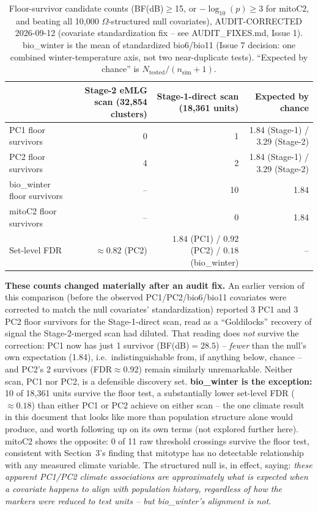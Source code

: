 \documentclass[11pt]{article}
\begin{document}
\begin{table}[H]\centering\small
\begin{tabular}{lrrr}
\toprule
 & Stage-2 eMLG scan (32{,}854 clusters) & Stage-1-direct scan (18{,}361 units) & Expected by chance \\
\midrule
PC1 floor survivors & 0 & 1 & 1.84 (Stage-1) / 3.29 (Stage-2) \\
PC2 floor survivors & 4 & 2 & 1.84 (Stage-1) / 3.29 (Stage-2) \\
bio\_winter floor survivors & -- & 10 & 1.84 \\
mitoC2 floor survivors & -- & 0 & 1.84 \\
Set-level FDR & $\approx0.82$ (PC2) & $1.84$ (PC1) / $0.92$ (PC2) / $\mathbf{0.18}$ (bio\_winter) & -- \\
\bottomrule
\end{tabular}
\caption{Floor-survivor candidate counts (BF(dB)$\geq$15, or $-\log_{10}(p)\geq3$ for
mitoC2, and beating all 10{,}000 $\Omega$-structured null covariates), AUDIT-CORRECTED
2026-09-12 (covariate standardization fix -- see AUDIT\_FIXES.md, Issue 1). bio\_winter is
the mean of standardized bio6/bio11 (Issue 7 decision: one combined winter-temperature axis,
not two near-duplicate tests). ``Expected by chance'' is $N_{\mathrm{tested}}/(n_{\mathrm{sim}}+1)$.}
\end{table}

\textbf{These counts changed materially after an audit fix.} An earlier version of this
comparison (before the observed PC1/PC2/bio6/bio11 covariates were corrected to match the
null covariates' standardization) reported 3 PC1 and 3 PC2 floor survivors for the
Stage-1-direct scan, read as a ``Goldilocks'' recovery of signal the Stage-2-merged scan had
diluted. That reading does \emph{not} survive the correction: PC1 now has just 1 survivor
(BF(dB)$=28.5$) -- \emph{fewer} than the null's own expectation (1.84), i.e.\ indistinguishable
from, if anything below, chance -- and PC2's 2 survivors (FDR$\approx0.92$) remain similarly
unremarkable. Neither scan, PC1 nor PC2, is a defensible discovery set.
\textbf{bio\_winter is the exception:} 10 of 18{,}361 units survive the floor test, a
substantially lower set-level FDR ($\approx0.18$) than either PC1 or PC2 achieve on either
scan -- the one climate result in this document that looks like more than population
structure alone would produce, and worth following up on its own terms (not explored further
here). mitoC2 shows the opposite: 0 of 11 raw threshold crossings survive the floor test,
consistent with Section~3's finding that mitotype has no detectable relationship with any
measured climate variable. The structured null is, in effect, saying: \emph{these apparent
PC1/PC2 climate associations are approximately what is expected when a covariate happens to
align with population history, regardless of how the markers were reduced to test units --
but bio\_winter's alignment is not.}
\end{document}
